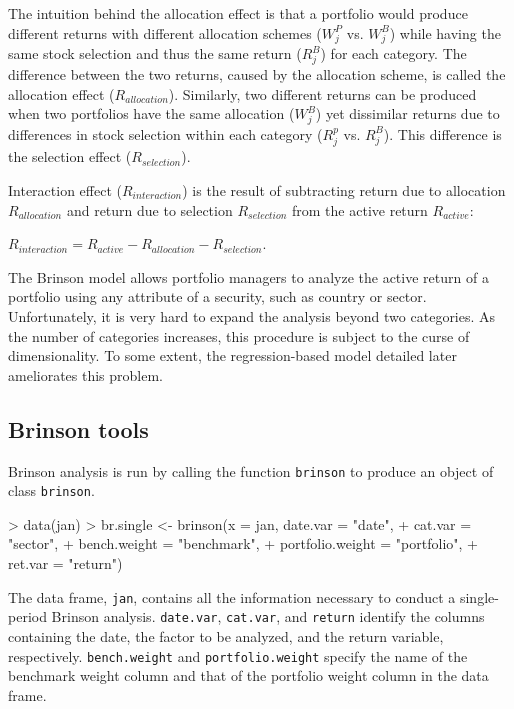 The intuition behind the allocation effect is that a portfolio would
produce different returns with different allocation schemes ($W^P_j$
vs. $W^B_j$) while having the same stock selection and thus the same
return ($R^B_j$) for each category. The difference between the two
returns, caused by the allocation scheme, is called the allocation
effect ($R_{allocation}$). Similarly, two different returns can be
produced when two portfolios have the same allocation ($W^B_j$) yet
dissimilar returns due to differences in stock selection within each
category ($R^p_j$ vs. $R^B_j$). This difference is the selection
effect ($R_{selection}$).

Interaction effect ($R_{interaction}$) is the result of subtracting
return due to allocation $R_{allocation}$ and return due to selection
$R_{selection}$ from the active return $R_{active}$:
\begin{center}
  $R_{interaction} = R_{active} - R_{allocation} - R_{selection}$.
\end{center}

The Brinson model allows portfolio managers to analyze the active
return of a portfolio using any attribute of a security, such as
country or sector. Unfortunately, it is very hard to expand the
analysis beyond two categories. As the number of categories increases,
this procedure is subject to the curse of dimensionality. To some
extent, the regression-based model detailed later ameliorates this
problem.


\subsection{Brinson tools}

Brinson analysis is run by calling the function \texttt{brinson} to
produce an object of class \texttt{brinson}. 

\begin{Schunk}
\begin{Sinput}
> data(jan)
> br.single <- brinson(x = jan, date.var = "date", 
+                  cat.var = "sector",
+                  bench.weight = "benchmark", 
+                  portfolio.weight = "portfolio", 
+                  ret.var = "return")
\end{Sinput}
\end{Schunk}

The data frame, \texttt{jan}, contains all the information necessary
to conduct a single-period Brinson analysis. \texttt{date.var},
\texttt{cat.var}, and \texttt{return} identify the columns containing
the date, the factor to be analyzed, and the return variable,
respectively. \texttt{bench.weight} and \texttt{portfolio.weight}
specify the name of the benchmark weight column and that of the
portfolio weight column in the data frame.

